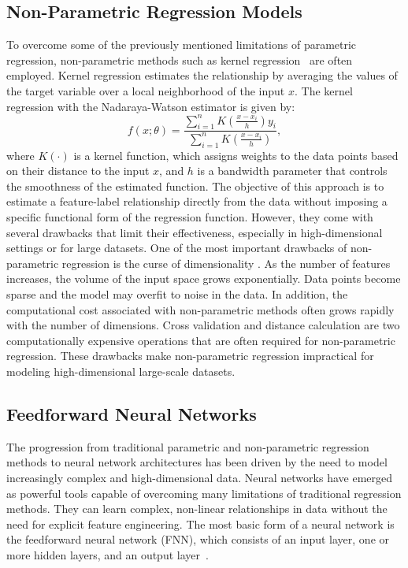 \subsection{Non-Parametric Regression Models}
To overcome some of the previously mentioned limitations of parametric regression, non-parametric methods such as kernel regression~\citep{hastie2009elements} are often employed. 
Kernel regression estimates the relationship by averaging the values of the target variable over a local neighborhood of the input $x$.
The kernel regression with the Nadaraya-Watson estimator is given by:
\begin{equation}
    f(x; \theta) = \frac{\sum_{i=1}^{n} K\left(\frac{x-x_i}{h}\right) y_i}{\sum_{i=1}^{n} K\left(\frac{x-x_i}{h}\right)},
\end{equation}
where $K(\cdot)$ is a kernel function, which assigns weights to the data points based on their distance to the input $x$, and $h$ is a bandwidth parameter that controls the smoothness of the estimated function.
The objective of this approach is to estimate a feature-label relationship directly from the data without imposing a specific functional form of the regression function.
However, they come with several drawbacks that limit their effectiveness, especially in high-dimensional settings or for large datasets. 
One of the most important drawbacks of non-parametric regression is the curse of dimensionality \cite{bellman1966dynamic}. 
As the number of features increases, the volume of the input space grows exponentially.
Data points become sparse and the model may overfit to noise in the data.
In addition, the computational cost associated with non-parametric methods often grows rapidly with the number of dimensions.
Cross validation and distance calculation are two computationally expensive operations that are often required for non-parametric regression.
These drawbacks make non-parametric regression impractical for modeling high-dimensional large-scale datasets. 

\subsection{Feedforward Neural Networks}

The progression from traditional parametric and non-parametric regression methods to neural network architectures has been driven by the need to model increasingly complex and high-dimensional data.
Neural networks have emerged as powerful tools capable of overcoming many limitations of traditional regression methods. 
They can learn complex, non-linear relationships in data without the need for explicit feature engineering.
The most basic form of a neural network is the feedforward neural network (FNN), which consists of an input layer, one or more hidden layers, and an output layer~\citep{goodfellow2016}.

